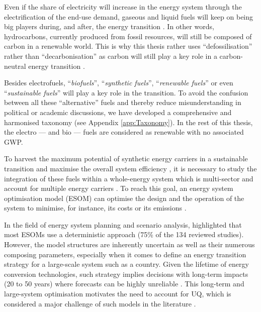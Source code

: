 Even if the share of electricity will increase in the energy system through the electrification of the end-use demand, gaseous and liquid fuels will keep on being big players during, and after, the energy transition \cite{Ahlgren2012}. In other words, hydrocarbons, currently produced from fossil resources, will still be composed of carbon in a renewable world. This is why this thesis rather uses ``defossilisation'' rather than ``decarbonisation'' as carbon will still play a key role in a carbon-neutral energy transition \cite{mertens2020carbon}. 

Besides electrofuels, ``\emph{biofuels}'', ``\emph{synthetic fuels}'', ``\emph{renewable fuels}'' or even ``\emph{sustainable fuels}'' will play a key role in the transition. To avoid the confusion between all these ``alternative'' fuels and thereby reduce misunderstanding in political or academic discussions, we have developed a comprehensive and harmonised taxonomy (see Appendix \ref{app:Taxonomy}).  In the rest of this thesis, the electro --- and bio --- fuels are considered as renewable with no associated \gls{GWP}.

To harvest the maximum potential of synthetic energy carriers in a sustainable transition and maximise the overall system efficiency \cite{mathiesen2015}, it is necessary to study the integration of these fuels within a whole-energy system which is multi-sector and account for multiple energy carriers \cite{contino2020whole}. To reach this goal, an energy system optimisation model (ESOM) can optimise the design and the operation of the system to minimise, for instance, its costs or its emissions \cite{zeng2011review}. 

In the field of energy system planning and scenario analysis, \citet{yue2018review} highlighted that most ESOMs use a deterministic approach (75\% of the 134 reviewed studies). However, the model structures are inherently uncertain as well as their numerous composing parameters, especially when it comes to define an energy transition strategy for a large-scale system such as a country. Given the lifetime of energy conversion technologies, such strategy implies decisions with long-term impacts (20 to 50 years) where forecasts can be highly unreliable \cite{Moret2017}. This long-term and large-system optimisation motivates the need to account for \gls{UQ}, which is considered a major challenge of such models in the literature \cite{pfenninger2014energy}. %

